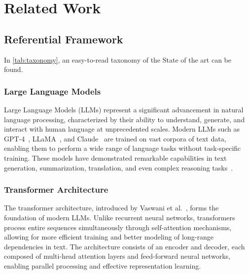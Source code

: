 \chapter{Related Work}
\label{cha:sota}



\section{Referential Framework}
In \ref{tab:taxonomy}, an easy-to-read taxonomy of the State of the art can be found.
\subsection{Large Language Models}
Large Language Models (LLMs) represent a significant advancement 
in natural language processing, characterized by their ability to 
understand, generate, and interact with human language at unprecedented 
scales. Modern LLMs such as GPT-4~\cite{openai2023}, LLaMA~\cite{grattafiori2024llama3herdmodels}, 
and Claude~\cite{anthropic2023} are trained on vast corpora of text data, 
enabling them to perform a wide range of language tasks without task-specific training. 
These models have demonstrated remarkable capabilities in text generation, summarization, translation, 
and even complex reasoning tasks~\cite{brown2020}.
\subsection{Transformer Architecture}
The transformer architecture, introduced by Vaswani et 
al.~\cite{vaswani2023attentionneed}, forms the foundation of modern 
LLMs. Unlike recurrent neural networks, transformers process entire 
sequences simultaneously through self-attention mechanisms, allowing for 
more efficient training and better modeling of long-range dependencies in 
text. The architecture consists of an encoder and decoder, each composed 
of multi-head attention layers and feed-forward neural networks, enabling 
parallel processing and effective representation learning.
